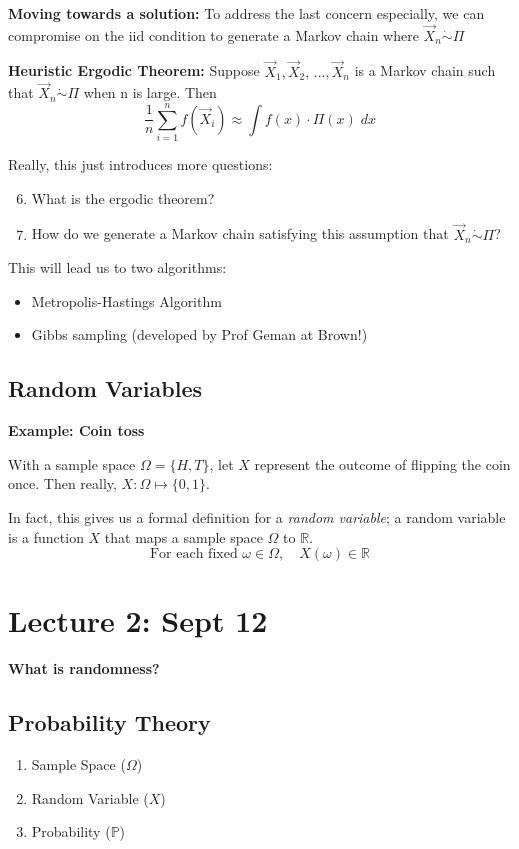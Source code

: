 \documentclass[12pt]{article}
\renewcommand{\P}{\mathbb{P}}
\newcommand{\R}{\mathbb{R}}
\begin{document}
\textbf{Moving towards a solution:} To address the last concern especially, we can compromise on the iid condition to generate a Markov chain where $\vec{X}_n \dot \sim \Pi$

\textbf{Heuristic Ergodic Theorem:}
Suppose $\vec{X}_1, \vec{X}_2,\, ..., \vec{X}_n$ is a Markov chain such that $\vec{X}_n \dot \sim \Pi$ when n is large. Then 
\[\frac{1}{n} \sum_{i=1}^n f(\vec{X}_i) \approx \int f(x) \cdot \Pi(x)\; dx\]

Really, this just introduces more questions:
\begin{enumerate}
    \setcounter{enumi}{5}
    \item What is the ergodic theorem?
    \item How do we generate a Markov chain satisfying this assumption that $\vec{X}_n \dot \sim \Pi$?
\end{enumerate}

This will lead us to two algorithms:
\begin{itemize}
    \item Metropolis-Hastings Algorithm
    \item Gibbs sampling (developed by Prof Geman at Brown!)
\end{itemize}

\subsection*{Random Variables}
\textbf{Example: Coin toss}

With a sample space $\Omega = \{H, T\}$, let $X$ represent the outcome of flipping the coin once. Then really, $X : \Omega \mapsto \{0, 1\}$.

In fact, this gives us a formal definition for a \emph{random variable}; a random variable is a function $X$ that maps a sample space $\Omega$ to $\R$.
\[\text{For each fixed } \omega \in \Omega, \quad X(\omega) \in \R\]

\section*{Lecture 2: Sept 12}
\textbf{What is randomness?}

\subsection*{Probability Theory}
\begin{enumerate}
    \item Sample Space ($\Omega$)
    \item Random Variable ($X$)
    \item Probability ($\P$)
\end{enumerate}
\end{document}
